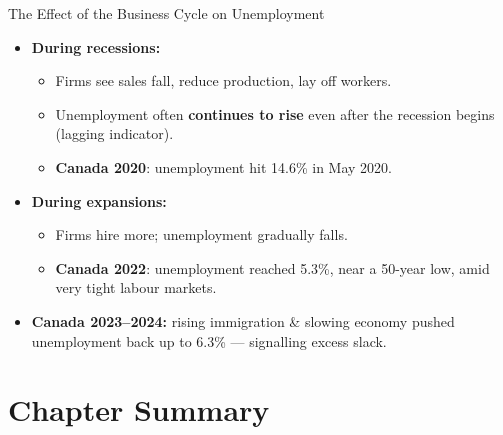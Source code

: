 \documentclass[aspectratio=169]{beamer}
\begin{document}
\begin{frame}{The Effect of the Business Cycle on Unemployment}
\transfade
\begin{itemize}[<+->]
  \item \textbf{During recessions:}
  \begin{itemize}[<+->]
    \item Firms see sales fall, reduce production, lay off workers.
    \item Unemployment often \textbf{continues to rise} even after the recession begins (lagging indicator).
    \item \textbf{Canada 2020}: unemployment hit \alert{14.6\%} in May 2020.
  \end{itemize}
  \item \textbf{During expansions:}
  \begin{itemize}[<+->]
    \item Firms hire more; unemployment gradually falls.
    \item \textbf{Canada 2022}: unemployment reached \alert{5.3\%}, near a 50-year low, amid very tight labour markets.
  \end{itemize}
  \item \textbf{Canada 2023--2024:} rising immigration \& slowing economy pushed unemployment back up to \alert{6.3\%} --- signalling excess slack.
\end{itemize}
\end{frame}

\section*{Chapter Summary}
\end{document}
